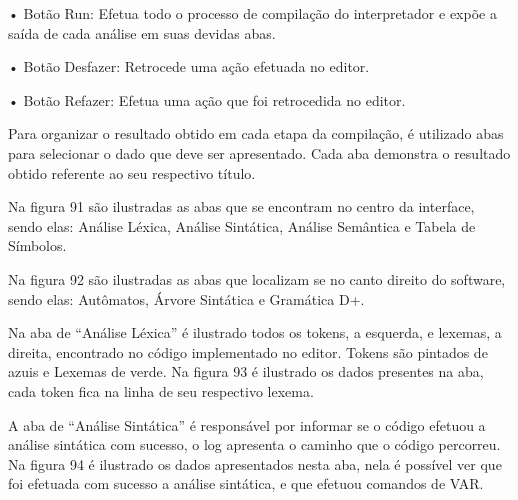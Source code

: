 \documentclass[12pt,oneside,a4paper,chapter=TITLE,section=TITLE,sumario=tradicional]{abntex2}
\begin{document}
•	Botão Run: Efetua todo o processo de compilação do interpretador e expõe a saída de cada análise em suas devidas abas.

•	Botão Desfazer: Retrocede uma ação efetuada no editor.

•	Botão Refazer: Efetua uma ação que foi retrocedida no editor.

\begin{figure}[H]
\end{figure}

Para organizar o resultado obtido em cada etapa da compilação, é utilizado abas para selecionar o dado que deve ser apresentado. Cada aba demonstra o resultado obtido referente ao seu respectivo título. 

Na figura 91 são ilustradas as abas que se encontram no centro da interface, sendo elas: Análise Léxica, Análise Sintática, Análise Semântica e Tabela de Símbolos.

\begin{figure}[H]
\end{figure}

Na figura 92 são ilustradas as abas que localizam se no canto direito do software, sendo elas: Autômatos, Árvore Sintática e Gramática D+.

\begin{figure}[H]
\end{figure}

Na aba de “Análise Léxica” é ilustrado todos os tokens, a esquerda, e lexemas, a direita, encontrado no código implementado no editor. Tokens são pintados de azuis e Lexemas de verde. Na figura 93 é ilustrado os dados presentes na aba, cada token fica na linha de seu respectivo lexema.

\begin{figure}[H]
\end{figure}

A aba de “Análise Sintática” é responsável por informar se o código efetuou a análise sintática com sucesso, o log apresenta o caminho que o código percorreu. Na figura 94 é ilustrado os dados apresentados nesta aba, nela é possível ver que foi efetuada com sucesso a análise sintática, e que efetuou comandos de VAR.
\end{document}
